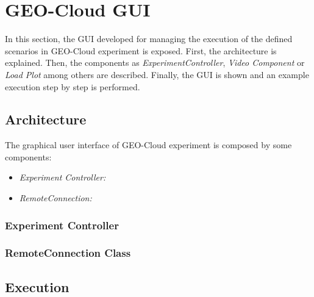 \section{GEO-Cloud GUI}

In this section, the \ac{GUI} developed for managing the execution of the defined
scenarios in GEO-Cloud experiment is exposed. First, the architecture is
explained. Then, the components as \emph{ExperimentController}, \emph{Video
  Component} or \emph{Load Plot} among others are described. Finally, the
\ac{GUI} is shown and an example execution step by step is performed.

\subsection{Architecture}

The graphical user interface of GEO-Cloud experiment is composed by some
components:

\begin{itemize}

\item \emph{Experiment Controller:}
\item \emph{RemoteConnection:}

\end{itemize}

\subsubsection{Experiment Controller}
\subsubsection{RemoteConnection Class}

\subsection{Execution}








